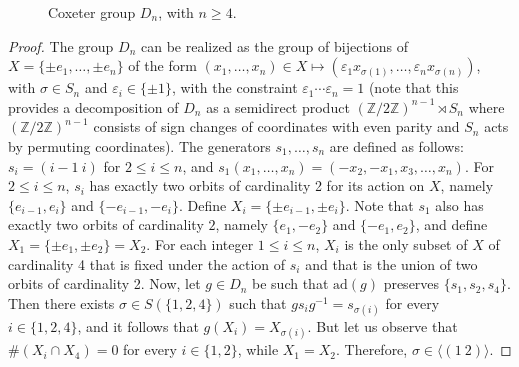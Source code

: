 \documentclass[a4paper, 11pt]{amsart}
\theoremstyle{definition}
\theoremstyle{remark}
\renewcommand{\leq}{\leqslant}
\renewcommand{\geq}{\geqslant}
\begin{document}
\begin{figure}[h!]
  \centering
  \caption{Coxeter group $D_n$, with $n\geq 4$.}
  \label{Dn}
\end{figure}

\begin{proof}
The group $D_n$ can be realized as the group of bijections of $X=\{\pm e_1,\dots,\pm e_n\}$ of the form $(x_1,\ldots,x_n)\in X \mapsto \left(\varepsilon_1 x_{\sigma(1)},\ldots, \varepsilon_n x_{\sigma(n)}\right)$, with $\sigma\in S_n$ and $\varepsilon_i \in \{\pm1\}$, with the constraint $\varepsilon_1\cdots \varepsilon_n = 1$ (note that this provides a decomposition of $D_n$ as a semidirect product $(\mathbb{Z}/2\mathbb{Z})^{n-1}\rtimes S_n$ where $(\mathbb{Z}/2\mathbb{Z})^{n-1}$ consists of sign changes of coordinates with even parity and $S_n$ acts by permuting coordinates). The generators $s_1,\ldots,s_n$ are defined as follows: $s_i=(i-1  \ i)$ for $2\leq i\leq n$, and $s_1(x_1,\ldots,x_n)=(-x_2,-x_1,x_3,\ldots,x_n)$. For $2\leq i\leq n$, $s_i$ has exactly two orbits of cardinality 2 for its action on $X$, namely $\lbrace e_{i-1},e_i\rbrace$ and $\lbrace -e_{i-1},-e_i\rbrace$. Define $X_i=\lbrace \pm e_{i-1},\pm e_i\rbrace$. Note that $s_1$ also has exactly two orbits of cardinality $2$, namely $\lbrace e_{1},-e_2\rbrace$ and $\lbrace -e_1,e_2\rbrace$, and define $X_1=\lbrace \pm e_{1},\pm e_2\rbrace=X_2$. For each integer $1\leq i\leq n
$, $X_i$ is the only subset of $X$ of cardinality 4 that is fixed under the action of $s_i$ and that is the union of two orbits of cardinality 2. Now, let $g\in D_n$ be such that $\mathrm{ad}(g)$ preserves $\lbrace s_1,s_2,s_4\rbrace$. Then there exists $\sigma\in S(\lbrace 1,2,4\rbrace)$ such that $gs_ig^{-1}=s_{\sigma(i)}$ for every $i\in \lbrace 1,2,4\rbrace$, and it follows that $g(X_i)=X_{\sigma(i)}$. But let us observe that $\#(X_i\cap X_4)=0$ for every $i\in \lbrace 1,2\rbrace$, while $X_1=X_2$. Therefore, $\sigma\in \langle (1 \ 2)\rangle$.\end{proof}
\end{document}
